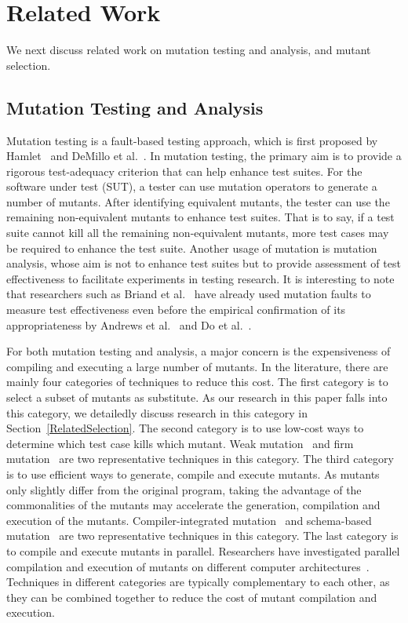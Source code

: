 \vspace{-1ex}
\section{Related Work}
\label{RelatedWork}

We next discuss related work on mutation testing and analysis, and
mutant selection.

\vspace{-1ex}
\subsection{Mutation Testing and Analysis}
\label{RelatedMutation}

Mutation testing is a fault-based testing approach, which is first
proposed by Hamlet~\cite{Hamlet:77} and DeMillo et
al.~\cite{DeMillo:78}. In mutation testing, the primary aim is to
provide a rigorous test-adequacy criterion that can help enhance
test suites. For the software under test (SUT), a tester can use
mutation operators to generate a number of mutants. After
identifying equivalent mutants, the tester can use the remaining
non-equivalent mutants to enhance test suites. That is to say, if
a test suite cannot kill all the remaining non-equivalent mutants,
more test cases may be required to enhance the test suite. Another
usage of mutation is mutation analysis, whose aim is not to
enhance test suites but to provide assessment of test
effectiveness to facilitate experiments in testing research. It is
interesting to note that researchers such as Briand et
al.~\cite{Briand:04} have already used mutation faults to measure
test effectiveness even before the empirical confirmation of its
appropriateness by Andrews et al.~\cite{Andrews:05} and Do et
al.~\cite{Do:06}.

For both mutation testing and analysis, a major concern is the
expensiveness of compiling and executing a large number of
mutants. In the literature, there are mainly four categories of
techniques to reduce this cost. The first category is to select a
subset of mutants as substitute. As our research in this paper
falls into this category, we detailedly discuss research in this
category in Section~\ref{RelatedSelection}. The second category is
to use low-cost ways to determine which test case kills which
mutant. Weak mutation~\cite{Howden:82} and firm
mutation~\cite{Woodward:88} are two representative techniques in
this category. The third category is to use efficient ways to
generate, compile and execute mutants. As mutants only slightly
differ from the original program, taking the advantage of the
commonalities of the mutants may accelerate the generation,
compilation and execution of the mutants. Compiler-integrated
mutation~\cite{DeMillo:91} and schema-based
mutation~\cite{Untch:93} are two representative techniques in this
category. The last category is to compile and execute mutants in
parallel. Researchers have investigated parallel compilation and
execution of mutants on different computer
architectures~\cite{Krauser:88,Offutt:92}. Techniques in different
categories are typically complementary to each other, as they can
be combined together to reduce the cost of mutant compilation and
execution.

